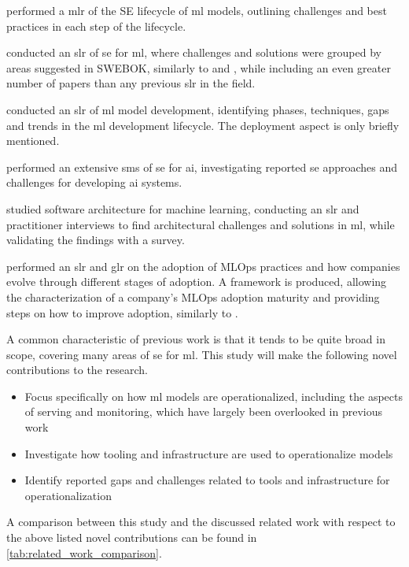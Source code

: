 \textcite{John2021} performed a \acrfull{mlr} of the SE lifecycle of \acrshort{ml} models, outlining challenges and best practices in each step of the lifecycle.

\textcite{Giray2021} conducted an \acrshort{slr} of \acrshort{se} for \acrshort{ml}, where challenges and solutions were grouped by areas suggested in SWEBOK, similarly to \cite{Kumeno2020} and \cite{Nascimento2020}, while including an even greater number of papers than any previous \acrshort{slr} in the field.

\textcite{Lorenzoni2021} conducted an \acrshort{slr} of \acrshort{ml} model development, identifying phases, techniques, gaps and trends in the \acrshort{ml} development lifecycle.
The deployment aspect is only briefly mentioned.

\textcite{MartinezFernandez2021} performed an extensive \acrshort{sms} of \acrshort{se} for \acrshort{ai}, investigating reported \acrshort{se} approaches and challenges for developing \acrshort{ai} systems.

\textcite{Serban2021} studied software architecture for machine learning, conducting an \acrshort{slr} and practitioner interviews to find architectural challenges and solutions in \acrshort{ml}, while validating the findings with a survey.

\textcite{John2021a} performed an \acrshort{slr} and \acrfull{glr} on the adoption of MLOps practices and how companies evolve through different stages of adoption.
A framework is produced, allowing the characterization of a company's MLOps adoption maturity and providing steps on how to improve adoption, similarly to \cite{Lwakatare2020a}.

A common characteristic of previous work is that it tends to be quite broad in scope, covering many areas of \acrshort{se} for \acrshort{ml}.
This study will make the following novel contributions to the research.
\begin{itemize}
    \item Focus specifically on how \acrshort{ml} models are operationalized, including the aspects of serving and monitoring, which have largely been overlooked in previous work
    \item Investigate how tooling and infrastructure are used to operationalize models
    \item Identify reported gaps and challenges related to tools and infrastructure for operationalization
\end{itemize}
A comparison between this study and the discussed related work with respect to the above listed novel contributions can be found in \cref{tab:related_work_comparison}.

